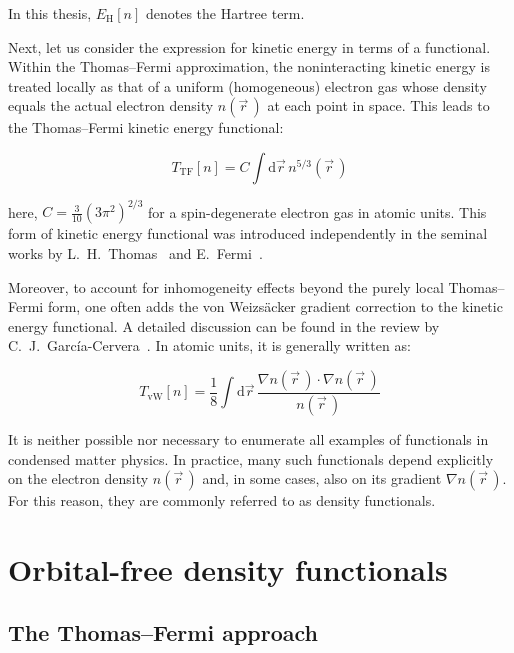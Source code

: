 In this thesis, $E_\mathrm{H}[n]$ denotes the Hartree term.

Next, let us consider the expression for kinetic energy in terms of a functional. Within the Thomas--Fermi approximation,
the noninteracting kinetic energy is treated locally as that of a uniform (homogeneous) electron gas whose density equals the actual electron density $n(\vec{r}\,)$ at each point in space.
This leads to the Thomas--Fermi kinetic energy functional:

\begin{equation}
    T_\mathrm{TF}[n]=C\int\mathrm{d}\vec{r}\,n^{5/3}(\vec{r}\,)
\label{tf_functional}
\end{equation}

here, $C=\frac{3}{10}(3\pi^2)^{2/3}$ for a spin-degenerate electron gas in atomic units.
This form of kinetic energy functional was introduced independently in the seminal works by L.~H.~Thomas~\cite{thomas1927calculation} and E.~Fermi~\cite{fermi1927metodo}.

Moreover, to account for inhomogeneity effects beyond the purely local Thomas--Fermi form, one often adds the von Weizsäcker gradient correction to the kinetic energy functional.
A detailed discussion can be found in the review by C.~J.~García-Cervera~\cite{garcia2007efficient}.
In atomic units, it is generally written as:

\begin{equation}
    T_\mathrm{vW}[n] = \frac{1}{8}\int \mathrm{d}\vec{r}\,\frac{\nabla n(\vec{r}\,)\cdot\nabla n(\vec{r}\,)}{n(\vec{r}\,)}
\label{vw_functional}
\end{equation}

It is neither possible nor necessary to enumerate all examples of functionals in condensed matter physics.
In practice, many such functionals depend explicitly on the electron density $n(\vec{r}\,)$ and, in some cases, also on its gradient $\nabla n(\vec{r}\,)$.
For this reason, they are commonly referred to as density functionals.

\newpage
\section{Orbital-free density functionals}
\label{sec:appendix_thomas_fermi}

\subsection{The Thomas--Fermi approach}

